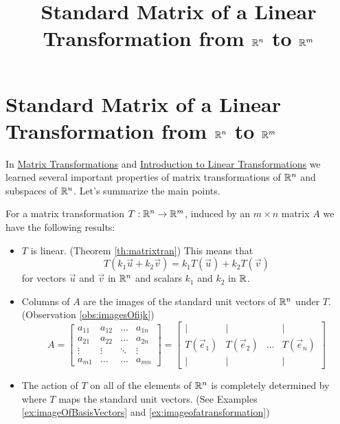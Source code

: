 \documentclass{ximera}
\title{Standard Matrix of a Linear Transformation from $\mathbb{R}^n$ to $\mathbb{R}^m$} \license{CC BY-NC-SA 4.0}
\begin{document}
\begin{abstract}
 \end{abstract}
\maketitle


\section*{Standard Matrix of a Linear Transformation from $\mathbb{R}^n$ to $\mathbb{R}^m$}

In \href{https://ximera.osu.edu/oerlinalg/LinearAlgebra/LTR-0005/main}{Matrix Transformations} and \href{https://ximera.osu.edu/oerlinalg/LinearAlgebra/LTR-0010/main}{Introduction to Linear Transformations} we learned several important properties of matrix transformations of $\mathbb{R}^n$ and subspaces of $\mathbb{R}^n$.  Let's summarize the main points.
\begin{summary}\label{sum:matrixTrans}
For a matrix transformation $T:\mathbb{R}^n\rightarrow\mathbb{R}^m$, induced by an $m\times n$ matrix $A$ we have the following results:
\begin{itemize}
    \item $T$ is linear. (Theorem \ref{th:matrixtran})  This means that 
    $$T(k_1\vec{u}+k_2\vec{v})= k_1T(\vec{u})+k_2T(\vec{v})$$
    for vectors $\vec{u}$ and $\vec{v}$ in $\mathbb{R}^n$ and scalars $k_1$ and $k_2$ in $\mathbb{R}$.
    \item Columns of $A$ are the images of the standard unit vectors of $\mathbb{R}^n$ under $T$. (Observation \ref{obs:imagesOfijk})
 \begin{equation*} \label{eq:matlintrans}
 A=\begin{bmatrix}
           a_{11} & a_{12}&\dots&a_{1n}\\
           a_{21}&a_{22} &\dots &a_{2n}\\
		\vdots & \vdots&\ddots &\vdots\\
		a_{m1}&\dots &\dots &a_{mn}
         \end{bmatrix}
		 = 
         \begin{bmatrix}
           | & |& &|\\
		T(\vec{e}_1) & T(\vec{e}_2)&\dots &T(\vec{e}_n)\\
		|&| & &|
         \end{bmatrix}
\end{equation*}
    
    \item The action of $T$ on all of the elements of $\mathbb{R}^n$ is completely determined by where $T$ maps the standard unit vectors. (See Examples \ref{ex:imageOfBasisVectors} and \ref{ex:imageofatransformation})
\end{itemize}
    
\end{summary}
\end{document}
